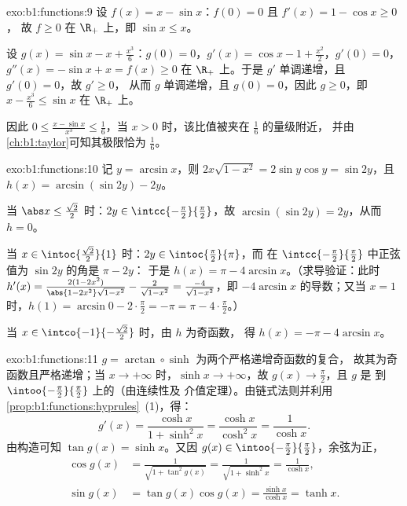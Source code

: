 \begin{solution}{exo:b1:functions:9}
设 $f(x) = x - \sin x$：$f(0) = 0$ 且 $f'(x) = 1 - \cos x \geq 0$，
故 $f \geq 0$ 在 $\R_+$ 上，即 $\sin x \leq x$。

设 $g(x) = \sin x - x + \frac{x^3}{6}$：$g(0) = 0$，$g'(x) = \cos x -
1 + \frac{x^2}{2}$，$g'(0) = 0$，$g''(x) = -\sin x + x = f(x) \geq 0$
在 $\R_+$ 上。于是 $g'$ 单调递增，且 $g'(0) = 0$，故 $g' \geq 0$，
从而 $g$ 单调递增，且 $g(0) = 0$，因此 $g \geq 0$，即 $x -
\frac{x^3}{6} \leq \sin x$ 在 $\R_+$ 上。

因此 $0 \leq \frac{x - \sin x}{x^3} \leq \frac 16$，当 $x >
0$ 时，该比值被夹在 $\frac16$ 的量级附近，
并由\cref{ch:b1:taylor}可知其极限恰为 $\frac 16$。
\end{solution}

\begin{solution}{exo:b1:functions:10}
记 $y = \arcsin x$，则 $2x\sqrt{1 - x^2} = 2\sin y\cos y = \sin
2y$，且 $h(x) = \arcsin(\sin 2y) - 2y$。

当 $\abs x \leq \frac{\sqrt 2}{2}$ 时：$2y \in
\intcc{-\frac\pi2}{\frac\pi2}$，故 $\arcsin(\sin 2y) = 2y$，从而 $h =
0$。

当 $x \in \intoc{\frac{\sqrt 2}{2}}{1}$ 时：$2y \in
\intoc{\frac\pi2}{\pi}$，而
在 $\intcc{-\frac\pi2}{\frac\pi2}$ 中正弦值为 $\sin 2y$ 的角是 $\pi - 2y$：
于是 $h(x) = \pi - 4\arcsin x$。（求导验证：此时
$h'(x) = \frac{2(1 - 2x^2)}{\abs{1 - 2x^2}\sqrt{1 - x^2}} -
\frac{2}{\sqrt{1-x^2}} = \frac{-4}{\sqrt{1 - x^2}}$，即
$-4\arcsin x$ 的导数；又当 $x = 1$ 时，$h(1) = \arcsin 0 - 2\cdot\frac\pi2
= -\pi = \pi - 4\cdot\frac\pi2$。）

当 $x \in \intco{-1}{-\frac{\sqrt 2}{2}}$ 时，由 $h$ 为奇函数，
得 $h(x) = -\pi - 4\arcsin x$。
\end{solution}

\begin{solution}{exo:b1:functions:11}
$g = \arctan \circ \sinh$ 为两个严格递增奇函数的复合，
故其为奇函数且严格递增；当 $x \to
+\infty$ 时，$\sinh x \to +\infty$，故 $g(x) \to \frac\pi2$，且 $g$ 是
到 $\intoo{-\frac\pi2}{\frac\pi2}$ 上的（由连续性及
介值定理）。由链式法则并利用
\cref{prop:b1:functions:hyprules}~(1)，得：
\[
g'(x) = \frac{\cosh x}{1 + \sinh^2 x} = \frac{\cosh x}{\cosh^2 x}
= \frac{1}{\cosh x} .
\]
由构造可知 $\tan g(x) = \sinh x$。又因 $g(x) \in
\intoo{-\frac\pi2}{\frac\pi2}$，余弦为正，
\begin{align*}
\cos g(x) &= \frac{1}{\sqrt{1 + \tan^2 g(x)}}
= \frac{1}{\sqrt{1 + \sinh^2 x}} = \frac{1}{\cosh x},\\
\sin g(x) &= \tan g(x) \cos g(x) = \frac{\sinh x}{\cosh x} = \tanh x .
\end{align*}
\end{solution}

